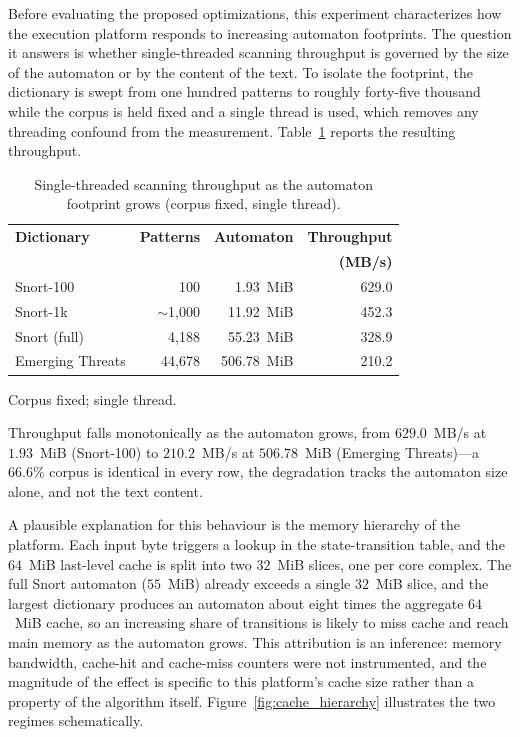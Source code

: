 Before evaluating the proposed optimizations, this experiment characterizes how
the execution platform responds to increasing automaton footprints. The question
it answers is whether single-threaded scanning throughput is governed by the size
of the automaton or by the content of the text. To isolate the footprint, the
dictionary is swept from one hundred patterns to roughly forty-five thousand while
the corpus is held fixed and a single thread is used, which removes any threading
confound from the measurement. Table~\ref{tab:footprint} reports the resulting
throughput.

\begin{table}[H]
    \centering
    \caption{Single-threaded scanning throughput as the automaton footprint grows
    (corpus fixed, single thread).}
    \label{tab:footprint}
    \small
    \begin{tabular}{@{} l r r r @{}}
        \toprule
        \textbf{Dictionary} & \textbf{Patterns} & \textbf{Automaton} & \textbf{Throughput} \\
         & & & \textbf{(MB/s)} \\
        \midrule
        Snort-100        & 100      & 1.93~MiB   & 629.0 \\ \addlinespace
        Snort-1k         & $\sim$1{,}000 & 11.92~MiB & 452.3 \\ \addlinespace
        Snort (full)     & 4{,}188  & 55.23~MiB  & 328.9 \\ \addlinespace
        Emerging Threats & 44{,}678 & 506.78~MiB & 210.2 \\
        \bottomrule
    \end{tabular}

    {\footnotesize\raggedright Corpus fixed; single thread.\par}
\end{table}

Throughput falls monotonically as the automaton grows, from $629.0$~MB/s at
$1.93$~MiB (Snort-100) to $210.2$~MB/s at $506.78$~MiB (Emerging Threats)---a
$66.6\%$
corpus is identical in every row, the degradation tracks the automaton size
alone, and not the text content.

A plausible explanation for this behaviour is the memory hierarchy of the
platform. Each input byte triggers a lookup in the state-transition table, and the
$64$~MiB last-level cache is split into two $32$~MiB slices, one per core complex.
The full Snort automaton ($55$~MiB) already exceeds a single $32$~MiB slice, and
the largest dictionary produces an automaton about eight times the aggregate
$64$~MiB cache, so an increasing share of transitions is likely to miss cache and
reach main memory as the automaton grows. This attribution is an inference:
memory bandwidth, cache-hit and cache-miss counters were not instrumented, and the
magnitude of the effect is specific to this platform's cache size rather than a
property of the algorithm itself. Figure~\ref{fig:cache_hierarchy} illustrates the
two regimes schematically.

